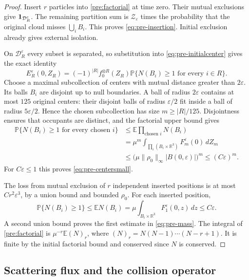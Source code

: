 \begin{proof}
Insert $r$ particles into \eqref{pre:factorial} at time zero.
Their mutual exclusions give $\mathbf1_{{\cal D}_R^\varepsilon}$.
The remaining partition sum is $\mathcal Z_\varepsilon$ times the
probability that the original cloud misses $\bigcup_iB_i$.
This proves \eqref{eq:pre-insertion}. Initial exclusion already gives
external isolation.

On $\mathcal D_R^\varepsilon$ every subset is separated, so substitution
into \eqref{eq:pre-initialcenter} gives the exact identity
\begin{equation}\label{eq:pre-occupancy}
 E_R^\varepsilon(0,Z_R)
 =(-1)^{|R|}f_0^{\otimes R}(Z_R)
       \mathbb P\{N(B_i)\geq1\text{ for every }i\in R\}.
\end{equation}
Choose a maximal subcollection of centers with mutual distance greater
than $2\varepsilon$. Its balls $B_i$ are disjoint up to null boundaries.
A ball of radius $2\varepsilon$ contains at most $125$ original centers:
their disjoint balls of radius $\varepsilon/2$ fit inside a ball of
radius $5\varepsilon/2$. Hence the chosen subcollection has size
$m\geq |R|/125$. Disjointness ensures that occupants are distinct, and
the factorial upper bound gives
\begin{align*}
 \mathbb P\{N(B_i)\geq1\text{ for every chosen }i\}
 &\leq\mathbb E\prod_{\text{chosen }i}N(B_i)\\
 &=\mu^m\int_{\prod_i(B_i\times\mathbb R^3)}
                          F_m^\varepsilon(0)\,dZ_m\\
 &\leq\bigl(\mu\|\rho_0\|_\infty|B(0,\varepsilon)|\bigr)^m
 \leq(C\varepsilon)^m.
\end{align*}
For $C\varepsilon\leq1$ this proves \eqref{eq:pre-centersmall}.

The loss from mutual exclusion of $r$ independent inserted positions
is at most $Cr^2\varepsilon^3$, by a union bound and bounded $\rho_0$.
For each inserted position,
\[
 \mathbb P\{N(B_i)\geq1\}\leq\mathbb E N(B_i)
 =\mu\int_{B_i\times\mathbb R^3}F_1^\varepsilon(0,z)\,dz
 \leq C\varepsilon.
\]
A second union bound proves the first estimate in \eqref{eq:pre-mass}.
The integral of \eqref{pre:factorial} is
$\mu^{-r}\mathbb E(N)_r$, where
$(N)_r=N(N-1)\cdots(N-r+1)$.
It is finite by the initial factorial bound and conserved since $N$ is
conserved.
\end{proof}

\subsection{Scattering flux and the collision operator}

